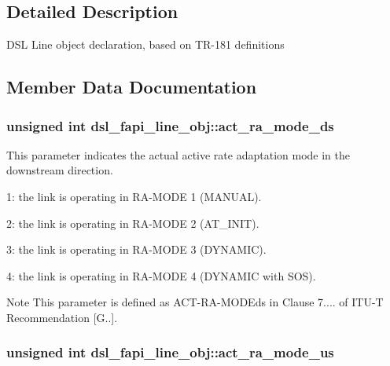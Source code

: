 \subsection{Detailed Description}
D\-S\-L Line object declaration, based on T\-R-\/181 definitions 

\subsection{Member Data Documentation}
\hypertarget{structdsl__fapi__line__obj_a7d571cdd52039fe9bc2e7399548dc7b0}{
\subsubsection[{act\-\_\-ra\-\_\-mode\-\_\-ds}]{\setlength{\rightskip}{0pt plus 5cm}unsigned int dsl\-\_\-fapi\-\_\-line\-\_\-obj\-::act\-\_\-ra\-\_\-mode\-\_\-ds}}\label{structdsl__fapi__line__obj_a7d571cdd52039fe9bc2e7399548dc7b0}
This parameter indicates the actual active rate adaptation mode in the downstream direction.
\begin{DoxyItemize}
\item 1\-: the link is operating in R\-A-\/\-M\-O\-D\-E 1 (M\-A\-N\-U\-A\-L).
\item 2\-: the link is operating in R\-A-\/\-M\-O\-D\-E 2 (A\-T\-\_\-\-I\-N\-I\-T).
\item 3\-: the link is operating in R\-A-\/\-M\-O\-D\-E 3 (D\-Y\-N\-A\-M\-I\-C).
\item 4\-: the link is operating in R\-A-\/\-M\-O\-D\-E 4 (D\-Y\-N\-A\-M\-I\-C with S\-O\-S). \begin{DoxyNote}{Note}
This parameter is defined as A\-C\-T-\/\-R\-A-\/\-M\-O\-D\-Eds in Clause 7.... of I\-T\-U-\/\-T Recommendation \mbox{[}G..\mbox{]}. 
\end{DoxyNote}

\end{DoxyItemize}\hypertarget{structdsl__fapi__line__obj_a56f462732df95fbff30dcd2664d2a599}{
\subsubsection[{act\-\_\-ra\-\_\-mode\-\_\-us}]{\setlength{\rightskip}{0pt plus 5cm}unsigned int dsl\-\_\-fapi\-\_\-line\-\_\-obj\-::act\-\_\-ra\-\_\-mode\-\_\-us}}\label{structdsl__fapi__line__obj_a56f462732df95fbff30dcd2664d2a599}
